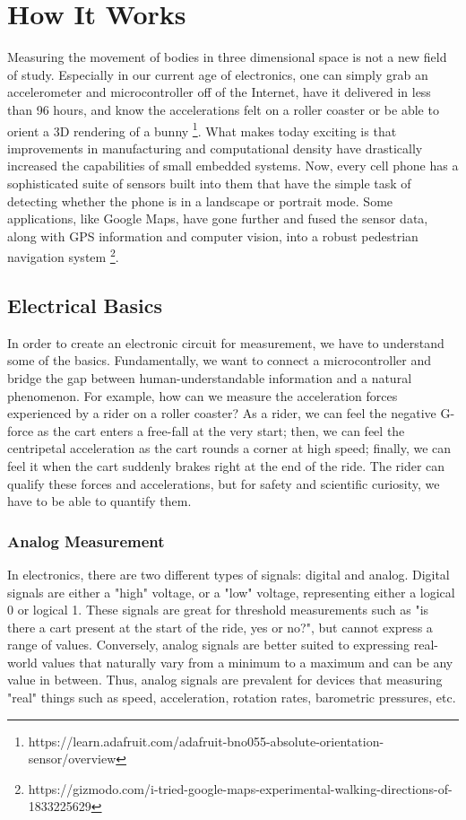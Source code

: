 \chapter{How  It Works}\label{chap:background}
Measuring the movement of bodies in three dimensional space is not a new field of study.
Especially in our current age of electronics, one can simply grab an accelerometer and microcontroller off of the Internet, have it delivered in less than 96 hours, and know the accelerations felt on a roller coaster or be able to orient a 3D rendering of a bunny \footnote[1]{https://learn.adafruit.com/adafruit-bno055-absolute-orientation-sensor/overview}.
What makes today exciting is that improvements in manufacturing and computational density have drastically increased the capabilities of small embedded systems.
Now, every cell phone has a sophisticated suite of sensors built into them that have the simple task of detecting whether the phone is in a landscape or portrait mode. 
Some applications, like Google Maps, have gone further and fused the sensor data, along with GPS information and computer vision, into a robust pedestrian navigation system \footnote[2]{https://gizmodo.com/i-tried-google-maps-experimental-walking-directions-of-1833225629}.

\section{Electrical Basics} \label{sec:bkg_measurement}
In order to create an electronic circuit for measurement, we have to understand some of the basics.
Fundamentally, we want to connect a microcontroller and bridge the gap between human-understandable information and a natural phenomenon.
For example, how can we measure the acceleration forces experienced by a rider on a roller coaster?
As a rider, we can feel the negative G-force as the cart enters a free-fall at the very start;
then, we can feel the centripetal acceleration as the cart rounds a corner at high speed;
finally, we can feel it when the cart suddenly brakes right at the end of the ride.
The rider can qualify these forces and accelerations, but for safety and scientific curiosity, we have to be able to quantify them.

\subsection{Analog Measurement} \label{ssec:analog_measurement}
In electronics, there are two different types of signals: digital and analog.
Digital signals are either a "high" voltage, or a "low" voltage, representing either a logical 0 or logical 1.
These signals are great for threshold measurements such as "is there a cart present at the start of the ride, yes or no?", but cannot express a range of values.
Conversely, analog signals are better suited to expressing real-world values that naturally vary from a minimum to a maximum and can be any value in between.
Thus, analog signals are prevalent for devices that measuring "real" things such as speed, acceleration, rotation rates, barometric pressures, etc.

